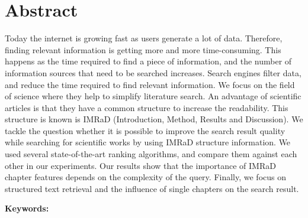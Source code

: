 \chapter*{Abstract}
\label{cha:abstract}

Today the internet is growing fast as users generate a lot of data. Therefore, finding relevant information is getting more and more time-consuming. This happens as the time required to find a piece of information, and the number of information sources that need to be searched increases. Search engines filter data, and reduce the time required to find relevant information. We focus on the field of science where they help to simplify literature search. An advantage of scientific articles is that they have a common structure to increase the readability. This structure is known is IMRaD (Introduction, Method, Results and Discussion). We tackle the question whether it is possible to improve the search result quality while searching for scientific works by using IMRaD structure information. We used several state-of-the-art ranking algorithms, and compare them against each other in our experiments. Our results show that the importance of IMRaD chapter features depends on the complexity of the query. Finally, we focus on structured text retrieval and the influence of single chapters on the search result.


\textbf{Keywords:} \mykeywords{}